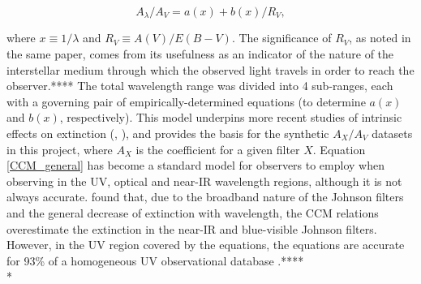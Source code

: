 \documentclass[12pt, a4paper]{report}
\begin{document}

\begin{equation}
A_{\lambda}/A_{V} = a(x) + b(x)/R_{V},
\label{CCM_general}
\end{equation}

where $x \equiv 1/\lambda$ and $R_{V} \equiv A(V)/E(B-V)$. The significance of $R_{V}$, as noted in the same paper, comes from its usefulness as an indicator of the nature of the interstellar medium through which the observed light travels in order to reach the observer.**** The total wavelength range was divided into 4 sub-ranges, each with a governing pair of empirically-determined equations (to determine $a(x)$ and $b(x)$, respectively). This model underpins more recent studies of intrinsic effects on extinction (\cite{2008PASP..120..583G}, \cite{2018MNRAS.479L.102C}), and provides the basis for the synthetic $A_{X}/A_{V}$ datasets in this project, where $A_{X}$ is the coefficient for a given filter $X$. Equation \ref{CCM_general} has become a standard model for observers to employ when observing in the UV, optical and near-IR wavelength regions, although it is not always accurate. \cite{1999PASP..111...63F} found that, due to the broadband nature of the Johnson filters and the general decrease of extinction with wavelength, the CCM relations overestimate the extinction in the near-IR and blue-visible Johnson filters. However, in the UV region covered by  the \cite{1989ApJ...345..245C} equations, the equations are accurate for 93\% of a homogeneous UV observational database \citep{2004ApJ...616..912V}.**** \\*
\end{document}
